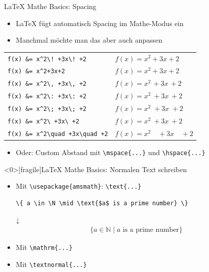 \documentclass[main.tex]{subfiles}
\begin{document}
\begin{frame}[fragile]{\LaTeX{} Mathe Basics: Spacing}
    \begin{itemize}
        \item \LaTeX{} fügt automatisch Spacing im Mathe-Modus ein
        \item Manchmal möchte man das aber auch anpassen
    \end{itemize}

    \begin{table}
        \centering
        \begin{tabular}{ll}
            \verb|f(x) &= x^2\! +3x\! +2| & $f(x) = x^2\! +3x\! +2$ \\
            \verb|f(x) &= x^2+3x+2|      & $f(x) = x^2+3x+2$ \\
            \verb|f(x) &= x^2\, +3x\, +2| & $f(x) = x^2\, +3x\, +2$ \\
            \verb|f(x) &= x^2\: +3x\: +2| & $f(x) = x^2\: +3x\: +2$ \\
            \verb|f(x) &= x^2\; +3x\; +2| & $f(x) = x^2\; +3x\; +2$ \\
            \verb|f(x) &= x^2\ +3x\ +2|  & $f(x) = x^2\ +3x\ +2$ \\
            \verb|f(x) &= x^2\quad +3x\quad +2| & $f(x) = x^2\quad +3x\quad +2$
        \end{tabular}
    \end{table}

    \begin{itemize}
        \item Oder: Custom Abstand mit \verb|\mspace{...}| und \verb|\hspace{...}|
    \end{itemize}
\end{frame}

\begin{frame}<0>[fragile]{\LaTeX{} Mathe Basics: Normalen Text schreiben}
    \begin{itemize}
        \item Mit \verb|\usepackage{amsmath}|: \verb|\text{...}|\medskip
        \begin{center}
            \begin{verbatim}
\{ a \in \N \mid \text{$a$ is a prime number} \}
            \end{verbatim}
            \vspace{-10pt}
            ↓
            \vspace{-5pt}
            \begin{align*}
                \{ a \in \mathbb{N} \mid \text{$a$ is a prime number} \}
            \end{align*}
        \end{center}
        \item Mit \verb|\mathrm{...}|
        \item Mit \verb|\textnormal{...}| 
    \end{itemize}
\end{frame}
\end{document}
